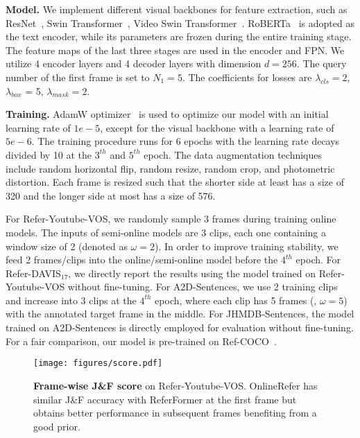 \documentclass[10pt,twocolumn,letterpaper]{article}
\begin{document}
\noindent\textbf{Model.}
We implement different visual backbones for feature extraction, such as ResNet~\cite{resnet}, Swin Transformer~\cite{liu2021swin}, Video Swin Transformer~\cite{videoswin}.
RoBERTa~\cite{liu2019roberta} is adopted as the text encoder, while  its parameters are frozen during the entire training stage.
The feature maps of the last three stages are used in the encoder and FPN.
We utilize 4 encoder layers and 4 decoder layers with dimension $d\!=\!256$.
The query number of the first frame is set to $N_1\!=\!5$.
The coefficients for losses are $\lambda_{cls} = 2$, $\lambda_{box}$ = 5, $\lambda_{mask}=2$.








\noindent\textbf{Training.}
AdamW optimizer~\cite{loshchilov2017decoupled} is used to optimize our model with an initial learning rate of $1e\!-\!5$, except for the visual backbone with a learning rate of $5e\!-\!6$.
The training procedure runs for 6 epochs with the learning rate decays divided by 10 at the $3^{th}$ and $5^{th}$ epoch.
The data augmentation techniques  include random horizontal flip, random resize, random crop, and photometric distortion.
 Each frame is resized such that the shorter side at least has a size of 320 and the longer side at most has a size of 576.



 
For Refer-Youtube-VOS, we randomly sample 3 frames during training online models.
 The inputs of semi-online models are 3 clips, each one containing a window size of 2 (denoted as $\omega\!=\!2$).
In order to improve training stability, we feed 2 frames/clips into the online/semi-online model before the $4^{th}$ epoch.
For Refer-DAVIS$_{17}$, we directly report the results using the model trained on Refer-Youtube-VOS without fine-tuning.
For A2D-Sentences, we use 2 training clips and increase into 3 clips at the $4^{th}$ epoch, where each clip has 5 frames (\ie, $\omega=5$) with the annotated target frame in the middle.
For JHMDB-Sentences, the model trained on A2D-Sentences is directly employed for evaluation without fine-tuning.
For a fair comparison, our model is pre-trained on Ref-COCO~\cite{yu2016modeling}.

\begin{figure}
\centering
\small
	\texttt{[image: figures/score.pdf]}
	\vspace{-12pt}
	\caption{\textbf{Frame-wise J\&F score} on Refer-Youtube-VOS. OnlineRefer has similar J\&F accuracy with ReferFormer at the first frame but obtains better performance in subsequent frames benefiting from a good prior. }
	\vspace{-6 mm}
	\label{fig:score}
\end{figure}
\end{document}
